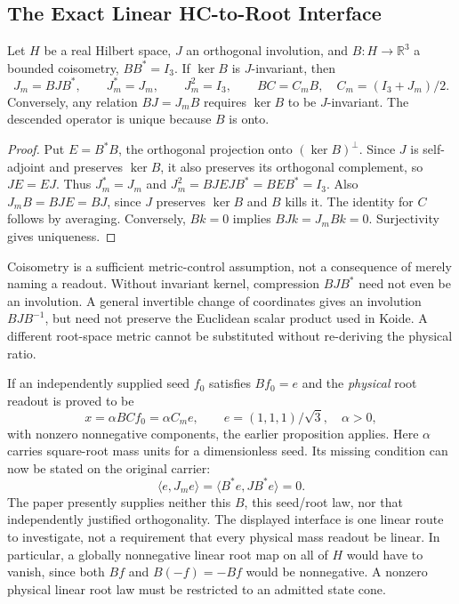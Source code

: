 \subsection{The Exact Linear HC-to-Root Interface}
\label{v480:hc-mass-interface}

\begin{proposition}
\label{v480:hc-mass-descent}
Let $H$ be a real Hilbert space, $J$ an orthogonal involution, and
$B:H\to\mathbb R^3$ a bounded coisometry, $BB^*=I_3$. If
$\ker B$ is $J$-invariant, then
\[
 J_m=BJB^*,\qquad J_m^*=J_m,\qquad J_m^2=I_3,
 \qquad BC=C_mB,\quad C_m=(I_3+J_m)/2.
\]
Conversely, any relation $BJ=J_mB$ requires $\ker B$ to be
$J$-invariant. The descended operator is unique because $B$ is onto.
\end{proposition}
\begin{proof}
Put $E=B^*B$, the orthogonal projection onto $(\ker B)^\perp$.
Since $J$ is self-adjoint and preserves $\ker B$, it also preserves
its orthogonal complement, so $JE=EJ$. Thus $J_m^*=J_m$ and
$J_m^2=BJEJB^*=BEB^*=I_3$. Also
$J_mB=BJE=BJ$, since $J$ preserves $\ker B$ and $B$ kills it.
The identity for $C$ follows by averaging. Conversely,
$Bk=0$ implies $BJk=J_mBk=0$. Surjectivity gives uniqueness.
\end{proof}

Coisometry is a sufficient metric-control assumption, not a consequence
of merely naming a readout. Without invariant kernel, compression
$BJB^*$ need not even be an involution. A general invertible change of
coordinates gives an involution $BJB^{-1}$, but need not preserve the
Euclidean scalar product used in Koide. A different root-space metric
cannot be substituted without re-deriving the physical ratio.

If an independently supplied seed $f_0$ satisfies $Bf_0=e$ and the
\emph{physical} root readout is proved to be
\[
 x=\alpha BCf_0=\alpha C_m e,\qquad
 e=(1,1,1)/\sqrt3,\quad \alpha>0,
\]
with nonzero nonnegative components, the earlier proposition applies.
Here $\alpha$ carries square-root mass units for a dimensionless seed.
Its missing condition can now be stated on the original carrier:
\[
 \langle e,J_me\rangle
   =\langle B^*e,JB^*e\rangle=0.
\]
The paper presently supplies neither this $B$, this seed/root law,
nor that independently justified orthogonality. The displayed
interface is one linear route to investigate, not a requirement that
every physical mass readout be linear. In particular, a globally
nonnegative linear root map on all of $H$ would have to vanish, since
both $Bf$ and $B(-f)=-Bf$ would be nonnegative. A nonzero physical
linear root law must be restricted to an admitted state cone.

